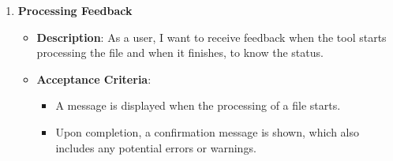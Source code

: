 \begin{enumerate}
    \item \textbf{Processing Feedback}
    \begin{itemize}
        \item \textbf{Description}: As a user, I want to receive feedback when the tool starts processing the file and when it finishes, to know the status.
        \item \textbf{Acceptance Criteria}:
        \begin{itemize}
            \item A message is displayed when the processing of a file starts.
            \item Upon completion, a confirmation message is shown, which also includes any potential errors or warnings.
        \end{itemize}
    \end{itemize}
\end{enumerate}